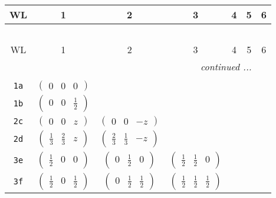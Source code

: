 \documentclass[fleqn,9pt,landscape]{jsarticle}
\begin{document}
\begin{center}
\renewcommand{\arraystretch}{1.2}
\begin{longtable}{ccccccc}
 \hline \hline
WL & 1 & 2 & 3 & 4 & 5 & 6 \\ \hline \endfirsthead

\multicolumn{6}{l}{\tablename\ \thetable{}} \\
 \hline \hline
WL & 1 & 2 & 3 & 4 & 5 & 6 \\ \hline \endhead

 \hline \hline
\multicolumn{6}{r}{\footnotesize\it continued ...} \\ \endfoot

 \hline \hline
\multicolumn{6}{r}{} \\ \endlastfoot

{\tt 1a} & $ \begin{pmatrix} 0 & 0 & 0 \end{pmatrix} $ & $  $ & $  $ & $  $ & $  $ & $  $ \\ \hline
{\tt 1b} & $ \begin{pmatrix} 0 & 0 & \frac{1}{2} \end{pmatrix} $ & $  $ & $  $ & $  $ & $  $ & $  $ \\ \hline
{\tt 2c} & $ \begin{pmatrix} 0 & 0 & z \end{pmatrix} $ & $ \begin{pmatrix} 0 & 0 & - z \end{pmatrix} $ & $  $ & $  $ & $  $ & $  $ \\ \hline
{\tt 2d} & $ \begin{pmatrix} \frac{1}{3} & \frac{2}{3} & z \end{pmatrix} $ & $ \begin{pmatrix} \frac{2}{3} & \frac{1}{3} & - z \end{pmatrix} $ & $  $ & $  $ & $  $ & $  $ \\ \hline
{\tt 3e} & $ \begin{pmatrix} \frac{1}{2} & 0 & 0 \end{pmatrix} $ & $ \begin{pmatrix} 0 & \frac{1}{2} & 0 \end{pmatrix} $ & $ \begin{pmatrix} \frac{1}{2} & \frac{1}{2} & 0 \end{pmatrix} $ & $  $ & $  $ & $  $ \\ \hline
{\tt 3f} & $ \begin{pmatrix} \frac{1}{2} & 0 & \frac{1}{2} \end{pmatrix} $ & $ \begin{pmatrix} 0 & \frac{1}{2} & \frac{1}{2} \end{pmatrix} $ & $ \begin{pmatrix} \frac{1}{2} & \frac{1}{2} & \frac{1}{2} \end{pmatrix} $ & $  $ & $  $ & $  $ \\ \hline

\end{longtable}
\end{center}
\end{document}
